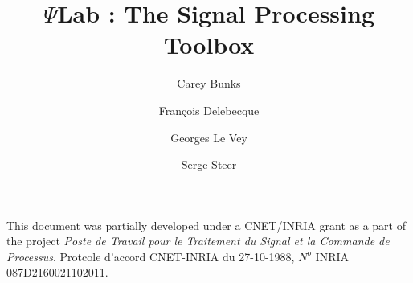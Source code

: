 \title{\Huge {$\Psi$Lab : The Signal Processing Toolbox}}
\author{Carey Bunks \and Fran\c cois Delebecque \and Georges Le Vey \and Serge Steer}

\maketitle 


\begin{titlepage}

\bigskip
\bigskip

This document was partially developed under a CNET/INRIA grant as a 
part of the project {\em Poste de Travail pour le Traitement du 
Signal et la Commande de Processus}. Protcole d'accord CNET-INRIA 
du 27-10-1988, $N^o$ INRIA 087D2160021102011.

\end{titlepage}

\tableofcontents
\listoffigures
